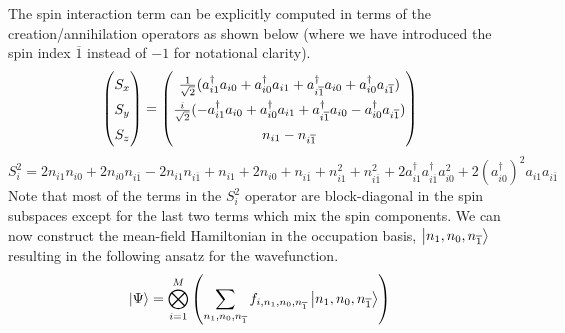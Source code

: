 The spin interaction term can be explicitly computed in terms of the creation/annihilation operators as shown below (where we have introduced the spin index $\overline{1}$ instead of $-1$ for notational clarity).
\begin{equation}
    \begingroup
    \renewcommand*{\arraystretch}{1.5}
    \begin{pmatrix}
        S_x \\
        S_y \\ 
        S_z
    \end{pmatrix}
    \endgroup = 
    \begingroup
    \renewcommand*{\arraystretch}{1.5}
    \begin{pmatrix}
        \frac{1}{\sqrt{2}}(a_{i1}^{\dagger}a_{i0} + a_{i0}^{\dagger}a_{i1} +a_{i\overline{1}}^{\dagger}a_{i0} + a_{i0}^{\dagger}a_{i\overline{1}}) \\ 
        \frac{i}{\sqrt{2}}(-a_{i1}^{\dagger}a_{i0} + a_{i0}^{\dagger}a_{i1} + a_{i\overline{1}}^{\dagger}a_{i0} - a_{i0}^{\dagger}a_{i\overline{1}})\\
        n_{i1} - n_{i\overline{1}}
    \end{pmatrix}
    \endgroup
\end{equation}
\begin{equation}
    S_i^2 = 2n_{i1}n_{i0} + 2n_{i0}n_{i\overline{1}} - 2n_{i1}n_{i\overline{1}} + n_{i1} + 2n_{i0} + n_{i\overline{1}} + n_{i1}^2 + n_{i\overline{1}}^2 + 2a_{i1}^{\dagger}a_{i\overline{1}}^{\dagger}a_{i0}^2 + 2(a_{i0}^{\dagger})^2a_{i1}a_{i\overline{1}}
\end{equation}
Note that most of the terms in the $S_i^2$ operator are block-diagonal in the spin subspaces except for the last two terms which mix the spin components. We can now construct the mean-field Hamiltonian in the occupation basis, $\ket{n_1, n_0, n_{\overline{1}}}$ resulting in the following ansatz for the wavefunction.
\begin{equation}
    \ket{\Psi} = \bigotimes_{i = 1}^M \left (\sum_{n_1, n_0, n_{\overline{1}}} f_{i, n_1, n_0, n_{\overline{1}}} \ket{n_1, n_0, n_{\overline{1}}} \right )
\end{equation}

